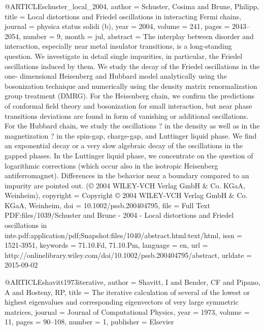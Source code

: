 @ARTICLE{schuster_local_2004,
  author = {Schuster, Cosima and Brune, Philipp},
  title = {Local distortions and {Friedel} oscillations in interacting {Fermi}
	chains},
  journal = {physica status solidi (b)},
  year = {2004},
  volume = {241},
  pages = {2043--2054},
  number = {9},
  month = jul,
  abstract = {The interplay between disorder and interaction, especially near metal
	insulator transitions, is a long-standing question. We investigate
	in detail single impurities, in particular, the Friedel oscillations
	induced by them. We study the decay of the Friedel oscillations in
	the one- dimensional Heisenberg and Hubbard model analytically using
	the bosonization technique and numerically using the density matrix
	renormalization group treatment (DMRG). For the Heisenberg chain,
	we confirm the predictions of conformal field theory and bosonization
	for small interaction, but near phase transitions deviations are
	found in form of vanishing or additional oscillations. For the Hubbard
	chain, we study the oscillations ? in the density as well as in the
	magnetization ? in the spin-gap, charge-gap, and Luttinger liquid
	phase. We find an exponential decay or a very slow algebraic decay
	of the oscillations in the gapped phases. In the Luttinger liquid
	phase, we concentrate on the question of logarithmic corrections
	(which occur also in the isotropic Heisenberg antiferromagnet). Differences
	in the behavior near a boundary compared to an impurity are pointed
	out. (© 2004 WILEY-VCH Verlag GmbH \& Co. KGaA, Weinheim)},
  copyright = {Copyright © 2004 WILEY-VCH Verlag GmbH \& Co. KGaA, Weinheim},
  doi = {10.1002/pssb.200404795},
  file = {Full Text PDF:files/1039/Schuster and Brune - 2004 - Local distortions and Friedel            oscillations in inte.pdf:application/pdf;Snapshot:files/1040/abstract.html:text/html},
  issn = {1521-3951},
  keywords = {71.10.Fd, 71.10.Pm},
  language = {en},
  url = {http://onlinelibrary.wiley.com/doi/10.1002/pssb.200404795/abstract},
  urldate = {2015-09-02}
}

@ARTICLE{shavitt1973iterative,
  author = {Shavitt, I and Bender, CF and Pipano, A and Hosteny, RP},
  title = {The iterative calculation of several of the lowest or highest eigenvalues
	and corresponding eigenvectors of very large symmetric matrices},
  journal = {Journal of Computational Physics},
  year = {1973},
  volume = {11},
  pages = {90--108},
  number = {1},
  publisher = {Elsevier}
}

